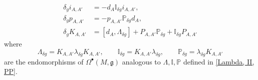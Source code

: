 \documentclass[11pt,a4paper]{amsart}
\theoremstyle{plain} %
\newtheorem{lem}[thm]{Lemma}
\theoremstyle{definition}
\theoremstyle{remark}
\newcommand{\g}{\mathfrak{g}}
\newcommand{\mr}{\mathrm}
\newcommand{\bt}{\bullet}
\newcommand{\ad}{\mathrm{ad}}
\begin{document}
{\begin{align}
    \delta_g i_{A,A'} &= -d_A\mathbb{I}_{\delta g}i_{A,A'}, \\ 
    \delta_g p_{A,A'} &= -p_{A,A'}\mathbb{P}_{\delta g} d_A, \\
    \delta_g K_{A,A'} &= [d_A,\Lambda_{\delta g}] + P_{A,A'} \mathbb{P}_{\delta g} + \mathbb{I}_{\delta g}P_{A,A'}
\end{align}
where 
\begin{equation}
    \Lambda_{\delta g} = K_{A,A'}\lambda_{\delta g} K_{A,A'},\qquad \mathbb{I}_{\delta g} = K_{A,A'}\lambda_{\delta g}, \qquad \mathbb{P}_{\delta g} = \lambda_{\delta g}  K_{A,A'}
\end{equation} are the endomorphisms of $\Omega^\bullet(M,\g)$ analogous to $\Lambda,\mathbb{I},\mathbb{P}$ defined in \eqref{Lambda, II, PP}.

}
\end{document}
